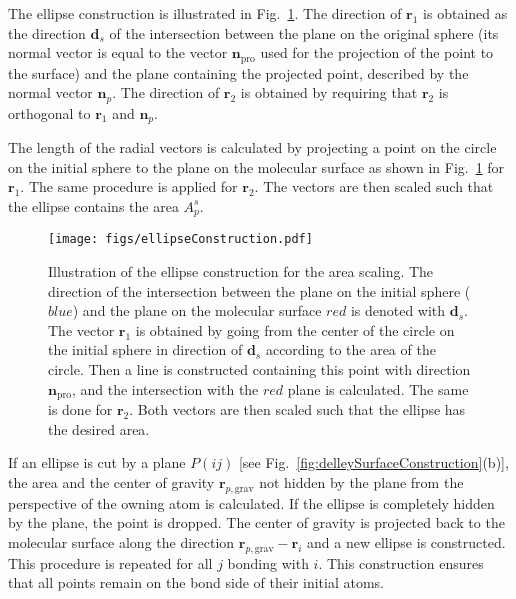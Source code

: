 The ellipse construction is illustrated in Fig.~\ref{fig:ellipseConstruction}.
The direction of $\pmb{r}_1$ is obtained as the direction $\pmb{d}_s$ of the intersection between
the plane on the original sphere (its normal vector is equal to the vector $\pmb{n}_\mathrm{pro}$
used for the projection of the point to the surface) and the plane containing
the projected point, described by the normal vector $\pmb{n}_p$. The direction of $\pmb{r}_2$ is obtained by
requiring that $\pmb{r}_2$ is orthogonal to $\pmb{r}_1$ and $\pmb{n}_p$.

The length of the radial vectors is calculated by projecting a point on the circle
on the initial sphere to the plane on the molecular surface as shown in Fig.~\ref{fig:ellipseConstruction}
for $\pmb{r}_1$. The same procedure is applied for $\pmb{r}_2$. The vectors are then scaled such that
the ellipse contains the area $A_p^s$.


\begin{figure}[H]
	\centering
	\texttt{[image: figs/ellipseConstruction.pdf]}
	\caption{Illustration of the ellipse construction for the area scaling.
	         The direction of the intersection between the plane on the initial sphere ($blue$)
	         and the plane on the molecular surface $red$ is denoted with $\pmb{d}_s$.
	         The vector $\pmb{r}_1$ is obtained by going from the center of the circle on the
	         initial sphere in direction of $\pmb{d}_s$ according to the area of the circle.
	         Then a line is constructed containing this point with direction $\pmb{n}_\mathrm{pro}$,
	         and the intersection with the $red$ plane is calculated. The same is done for $\pmb{r}_2$.
	         Both vectors are then scaled such that the ellipse has the desired area.}
	\label{fig:ellipseConstruction}
\end{figure}

If an ellipse is cut by a plane $P(ij)$ [see Fig.~\ref{fig:delleySurfaceConstruction}(b)], the area and the center
of gravity $\pmb{r}_{p,\mathrm{grav}}$ not hidden by the plane from the perspective of the owning atom is calculated.
If the ellipse is completely hidden by the plane, the point is dropped.
The center of gravity is projected back to the molecular surface along the direction
$\pmb{r}_{p,\mathrm{grav}}-\pmb{r}_i$ and a new ellipse is constructed. This procedure is repeated for all $j$ bonding
with $i$. This construction ensures that all points remain on the bond side of their initial atoms.
